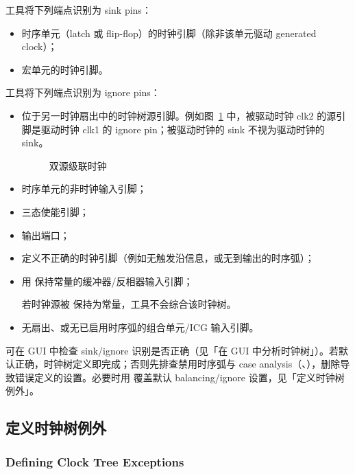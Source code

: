 工具将下列端点识别为 sink pins：
\begin{itemize}
  \item 时序单元（latch 或 flip-flop）的时钟引脚（除非该单元驱动 generated clock）；
  \item 宏单元的时钟引脚。
\end{itemize}

工具将下列端点识别为 ignore pins：
\begin{itemize}
  \item 位于另一时钟扇出中的时钟树源引脚。例如图~\ref{fig:cts-cascaded} 中，被驱动时钟 clk2 的源引脚是驱动时钟 clk1 的 ignore pin；被驱动时钟的 sink 不视为驱动时钟的 sink。
\begin{figure}[htbp]
\centering
{}
\caption{双源级联时钟}
\label{fig:cts-cascaded}
\end{figure}
  \item 时序单元的非时钟输入引脚；
  \item 三态使能引脚；
  \item 输出端口；
  \item 定义不正确的时钟引脚（例如无触发沿信息，或无到输出的时序弧）；
  \item 用  保持常量的缓冲器/反相器输入引脚；
\begin{noteBox}
若时钟源被  保持为常量，工具不会综合该时钟树。
\end{noteBox}
  \item 无扇出、或无已启用时序弧的组合单元/ICG 输入引脚。
\end{itemize}

可在 GUI 中检查 sink/ignore 识别是否正确（见「在 GUI 中分析时钟树」）。若默认正确，时钟树定义即完成；否则先排查禁用时序弧与 case analysis（、），删除导致错误定义的设置。必要时用  覆盖默认 balancing/ignore 设置，见「定义时钟树例外」。

\subsection{定义时钟树例外}
\subsubsection*{Defining Clock Tree Exceptions}

